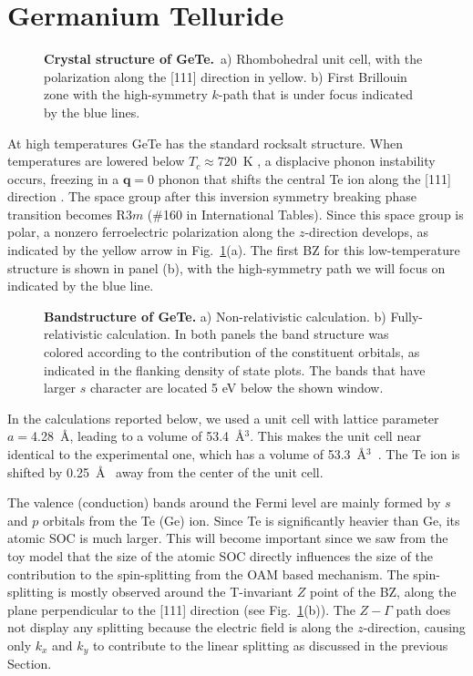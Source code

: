 \section{Germanium Telluride}
\begin{figure}[h]
\caption{\label{fig:Rashba_crystal}{\bf Crystal structure of GeTe.}~a) Rhombohedral unit cell, with the polarization along the [111] direction in yellow. b) First Brillouin zone with the high-symmetry $k$-path that is under focus indicated by the blue lines.}
\end{figure}
At high temperatures GeTe has the standard rocksalt structure.
When temperatures are lowered below $T_c \approx 720$~K \cite{DiSante2013}, a displacive phonon instability occurs, freezing in a $\bm{q} = 0$ phonon that shifts the central Te ion along the [111] direction \cite{Rabe1987}.
The space group after this inversion symmetry breaking phase transition becomes R$3m$ (\#160 in International Tables).
Since this space group is polar, a nonzero ferroelectric polarization along the $z$-direction develops, as indicated by the yellow arrow in Fig.~\ref{fig:Rashba_crystal}(a).
The first BZ for this low-temperature structure is shown in panel (b), with the high-symmetry path we will focus on indicated by the blue line.

\begin{figure}[h!]
\caption{\label{fig:Rashba_bands_dos}{\bf Bandstructure of GeTe.} a) Non-relativistic calculation. b) Fully-relativistic calculation. In both panels the band structure was colored according to the contribution of the constituent orbitals, as indicated in the flanking density of state plots. The bands that have larger $s$ character are located 5 eV below the shown window.}
\end{figure}
In the calculations reported below, we used a unit cell with lattice parameter $a=$4.28~\AA, leading to a volume of 53.4~\AA$^3$.
This makes the unit cell near identical to the experimental one, which has a volume of 53.3~\AA$^3$~\cite{Serebryanaya1995}.
The Te ion is shifted by 0.25~\AA~ away from the center of the unit cell.

The valence (conduction) bands around the Fermi level are mainly formed by $s$ and $p$ orbitals from the Te (Ge) ion.
Since Te is significantly heavier than Ge, its atomic SOC is much larger. This will become important since we saw from the toy model that the size of the atomic SOC directly influences the size of the contribution to the spin-splitting from the OAM based mechanism.
The spin-splitting is mostly observed around the T-invariant $Z$ point of the BZ, along the plane perpendicular to the [111] direction (see Fig.~\ref{fig:Rashba_crystal}(b)).
The $Z-\Gamma$ path does not display any splitting because the electric field is along the $z$-direction, causing only  $k_x$ and $k_y$ to contribute to the linear splitting as discussed in the previous Section.


